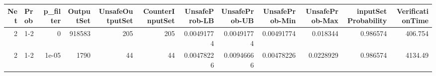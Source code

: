 \begin{tabular}{rlrrrrrrrrrr}
\hline
   Net & Prob   &   p\_filter &   OutputSet &   UnsafeOutputSet &   CounterInputSet &   UnsafeProb-LB &   UnsafeProb-UB &   UnsafeProb-Min &   UnsafeProb-Max &   inputSet Probability &   VerificationTime \\
\hline
     2 & 1-2    &      0     &      918583 &               205 &               205 &      0.00491774 &      0.00491774 &       0.00491774 &        0.018344  &               0.986574 &            406.754 \\
     2 & 1-2    &      1e-05 &        1790 &                44 &                44 &      0.00478226 &      0.00946666 &       0.00478226 &        0.0228929 &               0.986574 &           4134.49  \\
\hline
\end{tabular}
